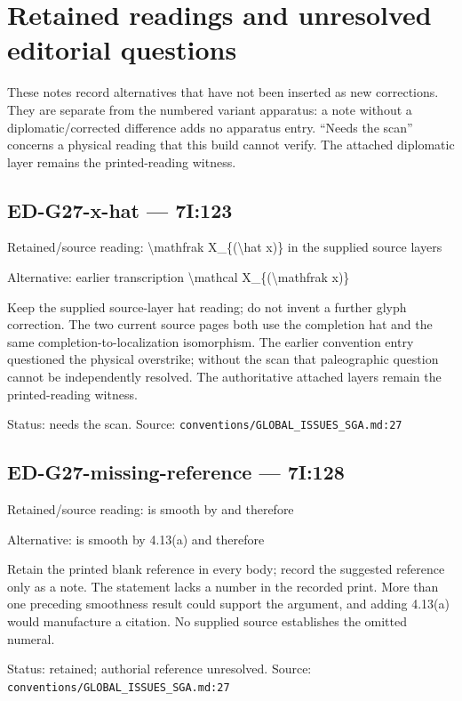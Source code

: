 \clearpage

\section*{Retained readings and unresolved editorial questions}

These notes record alternatives that have not been inserted as new corrections. They are separate from the numbered variant apparatus: a note without a diplomatic/corrected difference adds no apparatus entry. “Needs the scan” concerns a physical reading that this build cannot verify. The attached diplomatic layer remains the printed-reading witness.

\subsection*{ED-G27-x-hat — 7I:123}

Retained/source reading: \textbackslash{}mathfrak X\_\{(\textbackslash{}hat x)\} in the supplied source layers

Alternative: earlier transcription \textbackslash{}mathcal X\_\{(\textbackslash{}mathfrak x)\}

Keep the supplied source-layer hat reading; do not invent a further glyph correction. The two current source pages both use the completion hat and the same completion-to-localization isomorphism. The earlier convention entry questioned the physical overstrike; without the scan that paleographic question cannot be independently resolved. The authoritative attached layers remain the printed-reading witness.

Status: needs the scan. Source: \nolinkurl{conventions/GLOBAL_ISSUES_SGA.md:27}

\subsection*{ED-G27-missing-reference — 7I:128}

Retained/source reading: is smooth by and therefore

Alternative: is smooth by 4.13(a) and therefore

Retain the printed blank reference in every body; record the suggested reference only as a note. The statement lacks a number in the recorded print. More than one preceding smoothness result could support the argument, and adding 4.13(a) would manufacture a citation. No supplied source establishes the omitted numeral.

Status: retained; authorial reference unresolved. Source: \nolinkurl{conventions/GLOBAL_ISSUES_SGA.md:27}

